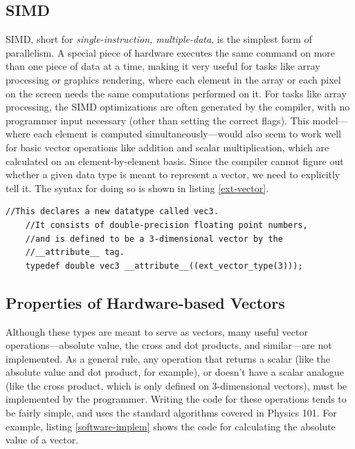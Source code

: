 \documentclass[thesis.tex]{subfiles}
\begin{document}



\subsection{SIMD}
SIMD, short for \emph{single-instruction, multiple-data}, is the simplest form of parallelism. A special piece of hardware executes the same command on more than one piece of data at a time, making it very useful for tasks like array processing or graphics rendering, where each element in the array or each pixel on the screen needs the same computations performed on it. For tasks like array processing, the SIMD optimizations are often generated by the compiler, with no programmer input necessary (other than setting the correct flags). This model---where each element is computed simultaneously---would also seem to work well for basic vector operations like addition and scalar multiplication, which are calculated on an element-by-element basis. Since the compiler cannot figure out whether a given data type is meant to represent a vector, we need to explicitly tell it. The syntax for doing so is shown in listing \ref{ext-vector}.


\begin{lstlisting}[caption={The declaration for EXT vector types. These vectors are
    not part of standard C, but are available on nearly all modern systems using the \code{clang} compiler.\label{ext-vector}}]
    //This declares a new datatype called vec3.
    //It consists of double-precision floating point numbers,
    //and is defined to be a 3-dimensional vector by the
    //__attribute__ tag.
    typedef double vec3 __attribute__((ext_vector_type(3)));
\end{lstlisting}



\subsection{Properties of Hardware-based Vectors}

Although these types are meant to serve as vectors, many useful vector operations---absolute value, the cross and dot products, and similar---are not implemented. As a general rule, any operation that returns a scalar (like the absolute value and dot product, for example), or doesn't have a scalar analogue (like the cross product, which is only defined on 3-dimensional vectors), must be implemented by the programmer. Writing the code for these operations tends to be fairly simple, and uses the standard algorithms covered in Physics 101. For example, listing \ref{software-implem} shows the code for calculating the absolute value of a vector.
\end{document}
